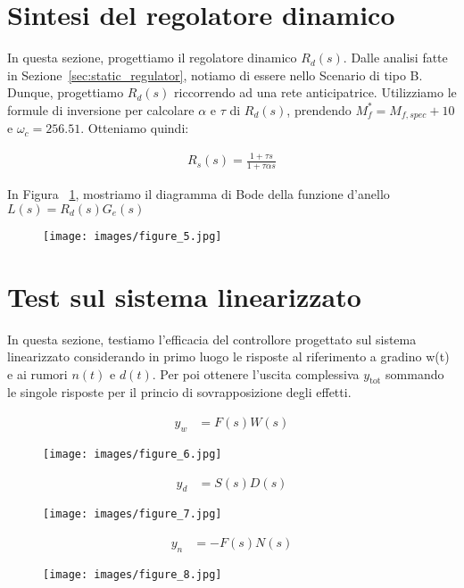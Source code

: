 \documentclass[a4paper, 11pt]{article}
\begin{document}
\section{Sintesi del regolatore dinamico}

In questa sezione, progettiamo il regolatore dinamico $R_d(s)$. 
%
Dalle analisi fatte in Sezione~\ref{sec:static_regulator}, notiamo di essere nello Scenario di tipo B. Dunque, progettiamo $R_d(s)$ riccorrendo ad una rete anticipatrice. Utilizziamo le formule di inversione per calcolare $\alpha$ e $\tau$ di $R_d(s)$, prendendo $M_f^*=M_{f,spec}+10$ e $\omega_c=256.51$. Otteniamo quindi:

\begin{align}\label{eq:R_s}
R_s(s)=\frac{1+\tau s}{1+\tau\alpha s}
\end{align}

In Figura ~\ref{Figura4}, mostriamo il diagramma di Bode della funzione d'anello $L(s) = R_d(s) G_e(s)$
\begin{figure}[H]
    \centering
\texttt{[image: images/figure\_5.jpg]}
    \caption{}
    \label{Figura4}
\end{figure}
\section{Test sul sistema linearizzato}

In questa sezione, testiamo l'efficacia del controllore progettato sul sistema linearizzato considerando in primo luogo le risposte al riferimento a gradino w(t) e ai rumori $n(t)$ e $d(t)$. Per poi ottenere l'uscita complessiva $y_{\text{tot}}$ sommando le singole risposte per il princio di sovrapposizione degli effetti.

\begin{subequations}\label{eq:Risposta1}
\begin{align}
 y_w &= F(s)W(s)
\end{align}
\end{subequations}
\begin{figure}[H]
    \centering
\texttt{[image: images/figure\_6.jpg]}
    \caption{}
    \label{Figura5}
\end{figure}
\begin{subequations}\label{eq:Risposta1}
\begin{align}
 y_d &= S(s)D(s)
\end{align}
\end{subequations}
\begin{figure}[H]
    \centering
\texttt{[image: images/figure\_7.jpg]}
    \caption{}
    \label{Figura6}
\end{figure}
\begin{subequations}\label{eq:Risposta1}
\begin{align}
 y_n &= -F(s)N(s)
\end{align}
\end{subequations}
\begin{figure}[H]
    \centering
\texttt{[image: images/figure\_8.jpg]}
    \caption{}
    \label{Figura7}
\end{figure}
\end{document}
